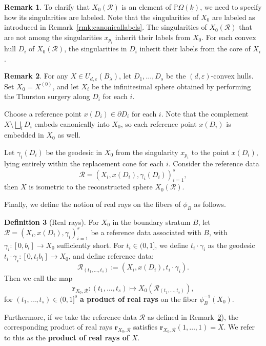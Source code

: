 \documentclass{compositio}
\numberwithin{equation}{section}
\numberwithin{figure}{section}
\theoremstyle{definition}
\newtheorem{definition}{Definition}[section]
\newtheorem{remark}[definition]{Remark}
\theoremstyle{plain}
\begin{document}
{\begin{remark}
To clarify that $X_0(\mathcal{R})$ is an element of $\mathbb{P}\Omega(\underline{k})$, we need to specify how its singularities are labeled. Note that the singularities of $X_0$ are labeled as introduced in Remark~\ref{rmk:canonicallabels}. The singularities of $X_0(\mathcal{R})$ that are not among the singularities $x_{p_i}$ inherit their labels from $X_0$. For each convex hull $D_i$ of $X_0(\mathcal{R})$, the singularities in $D_i$ inherit their labels from the core of $X_i$.
\end{remark}

\begin{remark}\label{rmk:inversethurstonsurgery}
For any $X \in U_{d,\varepsilon}(B_{\lambda})$, let $D_1, \ldots, D_s$ be the $(d,\varepsilon)$-convex hulls. Set $X_0 = X^{(0)}$, and let $X_i$ be the infinitesimal sphere obtained by performing the Thurston surgery along $D_i$ for each $i$. 

Choose a reference point $x(D_i) \in \partial D_i$ for each $i$. Note that the complement $X \setminus \bigsqcup_i D_i$ embeds canonically into $X_0$, so each reference point $x(D_i)$ is embedded in $X_0$ as well.

Let $\gamma_i(D_i)$ be the geodesic in $X_0$ from the singularity $x_{p_i}$ to the point $x(D_i)$, lying entirely within the replacement cone for each $i$. Consider the reference data
$$
\mathcal{R} = (X_i, x(D_i), \gamma_i(D_i))_{i=1}^s,
$$
then $X$ is isometric to the reconstructed sphere $X_0(\mathcal{R})$.
\end{remark}

Finally, we define the notion of real rays on the fibers of $\phi_B$ as follows. 
\begin{definition}[Real rays]\label{def:realrays}
    For $X_0$ in the boundary stratum $B$, let $\mathcal{R} = (X_i, x(D_i), \gamma_i)_{i=1}^s$ be a reference data associated with $B$, with $\gamma_i: [0, b_i] \to X_0$ sufficiently short. 
    For $t_i \in (0, 1]$, we define $t_i \cdot \gamma_i$ as the geodesic $t_i \cdot \gamma_i: [0, t_ib_i] \to X_0$, and define reference data:
    $$
    \mathcal{R}_{(t_1,\ldots,t_s)}:= (X_i, x(D_i), t_i\cdot\gamma_i).
    $$
    Then we call the map
    $$
    \mathbf{r}_{X_0,\mathcal{R}}: (t_1, \ldots, t_s) \mapsto X_0(\mathcal{R}_{(t_1,\ldots,t_s)}),
    $$
    for $(t_1,\ldots,t_s) \in (0, 1]^s$ \textbf{a product of real rays} on the fiber $\phi_B^{-1}(X_0)$.

    Furthermore, if we take the reference data $\mathcal{R}$ as defined in Remark~\ref{rmk:inversethurstonsurgery}), the corresponding product of real rays $\mathbf{r}_{X_0, \mathcal{R}}$ satisfies $\mathbf{r}_{X_0, \mathcal{R}}(1, \ldots, 1) = X$. We refer to this as the \textbf{product of real rays of $X$}.
\end{definition}

}
\end{document}
